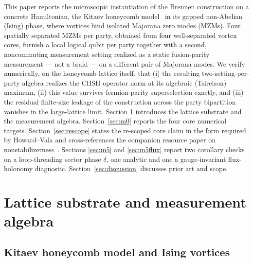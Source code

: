 \documentclass[aps,pra,twocolumn,superscriptaddress,floatfix,nofootinbib]{revtex4-2}
\begin{document}
This paper reports the microscopic instantiation of the Brennen
construction on a concrete Hamiltonian, the Kitaev honeycomb
model~\cite{Kitaev2003,Kitaev2006} in its gapped non-Abelian (Ising)
phase, where vortices bind isolated Majorana zero modes (MZMs).
Four spatially separated MZMs per party, obtained from four
well-separated vortex cores, furnish a local logical qubit per party
together with a second, noncommuting measurement setting realized as a
static fusion-parity measurement --- not a braid --- on a different
pair of Majorana modes. We verify numerically, on the honeycomb
lattice itself, that (i) the resulting two-setting-per-party algebra
realizes the CHSH operator norm at its algebraic (Tsirelson) maximum,
(ii) this value survives fermion-parity superselection exactly, and
(iii) the residual finite-size leakage of the construction across the
party bipartition vanishes in the large-lattice limit. Section
\ref{sec:setup} introduces the lattice substrate and the measurement
algebra. Section~\ref{sec:m0} reports the four core numerical targets.
Section~\ref{sec:rescope} states the re-scoped core claim in the form
required by Howard--Vala and cross-references the companion resource
paper on nonstabilizerness~\cite{Sayim2026magic}. Sections
\ref{sec:m5} and \ref{sec:m5flux} report two corollary checks on a
loop-threading sector phase $\delta$, one analytic and one a
gauge-invariant flux-holonomy diagnostic. Section~\ref{sec:discussion}
discusses prior art and scope.

\section{Lattice substrate and measurement algebra}
\label{sec:setup}

\subsection{Kitaev honeycomb model and Ising vortices}
\end{document}
